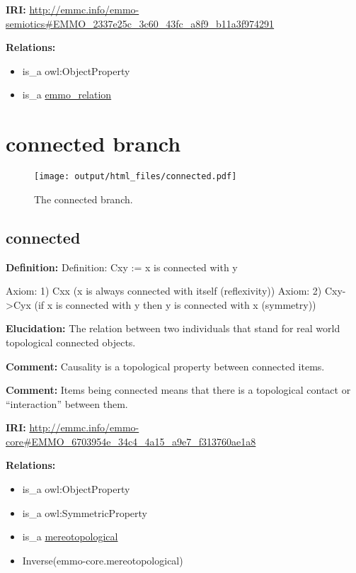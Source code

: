 \documentclass[a4paper,]{report}
\providecommand{\tightlist}{%
  \setlength{\itemsep}{0pt}\setlength{\parskip}{0pt}}
\begin{document}
\textbf{IRI:}
\url{http://emmc.info/emmo-semiotics\#EMMO_2337e25c_3c60_43fc_a8f9_b11a3f974291}

\textbf{Relations:}

\begin{itemize}
\tightlist
\item
  is\_a owl:ObjectProperty
\item
  is\_a \protect\hyperlink{emmo_relation}{emmo\_relation}
\end{itemize}

\hypertarget{connected-branch}{%
\section{connected branch}\label{connected-branch}}

\begin{figure}
\centering
\texttt{[image: output/html\_files/connected.pdf]}
\caption{The connected branch.}
\end{figure}

\hypertarget{connected}{%
\subsection{connected}\label{connected}}

\textbf{Definition:} Definition: Cxy := x is connected with y

Axiom: 1) Cxx (x is always connected with itself (reflexivity)) Axiom:
2) Cxy-\textgreater{}Cyx (if x is connected with y then y is connected
with x (symmetry))

\textbf{Elucidation:} The relation between two individuals that stand
for real world topological connected objects.

\textbf{Comment:} Causality is a topological property between connected
items.

\textbf{Comment:} Items being connected means that there is a
topological contact or ``interaction'' between them.

\textbf{IRI:}
\url{http://emmc.info/emmo-core\#EMMO_6703954e_34c4_4a15_a9e7_f313760ae1a8}

\textbf{Relations:}

\begin{itemize}
\tightlist
\item
  is\_a owl:ObjectProperty
\item
  is\_a owl:SymmetricProperty
\item
  is\_a \protect\hyperlink{mereotopological}{mereotopological}
\item
  Inverse(emmo-core.mereotopological)
\end{itemize}
\end{document}
